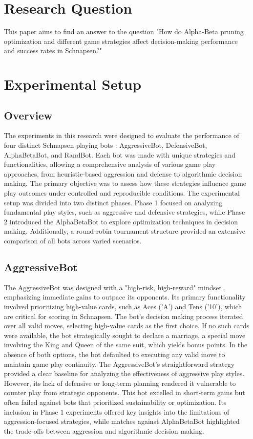 \documentclass[runningheads]{llncs}
\begin{document}
\section{Research Question}
This paper aims to find an answer to the question "How do Alpha-Beta pruning optimization and different game strategies affect decision-making performance and success rates in Schnapsen?"

\section{Experimental Setup}
\subsection{Overview}
The experiments in this research were designed to evaluate the performance of four distinct Schnapsen playing bots \cite{ref_adaptive_search}: AggressiveBot, DefensiveBot, AlphaBetaBot, and RandBot. Each bot was made with unique strategies and functionalities, allowing a comprehensive analysis of various game play approaches, from heuristic-based aggression and defense to algorithmic decision making. The primary objective was to assess how these strategies influence game play outcomes under controlled and reproducible conditions. The experimental setup was divided into two distinct phases. Phase 1 focused on analyzing fundamental play styles, such as aggressive and defensive strategies, while Phase 2 introduced the AlphaBetaBot to explore optimization techniques in decision making. Additionally, a round-robin tournament structure provided an extensive comparison of all bots across varied scenarios.

\subsection{AggressiveBot}
The AggressiveBot was designed with a "high-risk, high-reward" mindset \cite{ref_ieee_card}, emphasizing immediate gains to outpace its opponents. Its primary functionality involved prioritizing high-value cards, such as Aces ('A') and Tens ('10'), which are critical for scoring in Schnapsen. The bot’s decision making process iterated over all valid moves, selecting high-value cards as the first choice. If no such cards were available, the bot strategically sought to declare a marriage, a special move involving the King and Queen of the same suit, which yields bonus points. In the absence of both options, the bot defaulted to executing any valid move to maintain game play continuity.
 The AggressiveBot’s straightforward strategy provided a clear baseline for analyzing the effectiveness of aggressive play styles. However, its lack of defensive or long-term planning rendered it vulnerable to counter play from strategic opponents. This bot excelled in short-term gains but often failed against bots that prioritized sustainability or optimization. Its inclusion in Phase 1 experiments offered key insights into the limitations of aggression-focused strategies, while matches against AlphaBetaBot highlighted the trade-offs between aggression and algorithmic decision making.
\end{document}
